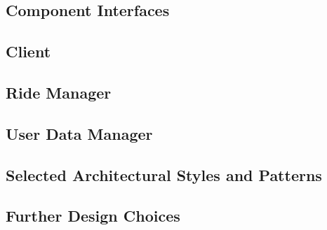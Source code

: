 \subsection{Component Interfaces}
	\subsection{Client}
		
	\subsection{Ride Manager}
		
	\subsection{User Data Manager}
		
	
\subsection{Selected Architectural Styles and Patterns}

\subsection{Further Design Choices}

